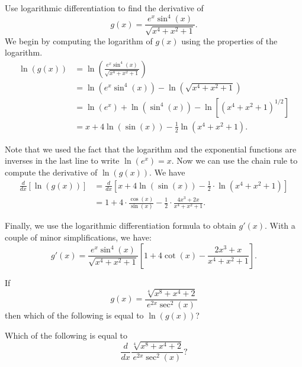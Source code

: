 \documentclass{ximera}
\begin{document}
\begin{example}
Use logarithmic differentiation to find the derivative of 
\[
g(x) = \frac{e^x \sin^4(x)}{\sqrt{x^4 + x^2 + 1}}.
\]
We begin by computing the logarithm of $g(x)$ using the properties of the logarithm.
\begin{align*}
\ln(g(x)) &= \ln\left(\frac{e^x \sin^4(x)}{\sqrt{x^4 + x^2 + 1}}\right)\\
&= \ln\left(e^x \sin^4(x)\right) - \ln\left(\sqrt{x^4 + x^2 + 1}\right)\\
&= \ln(e^x) + \ln(\sin^4(x)) - \ln[(x^4 + x^2 + 1)^{1/2}]\\
&= x + 4\ln(\sin(x)) - \frac12 \ln(x^4 + x^2 + 1).
\end{align*}

Note that we used the fact that the logarithm and the exponential functions are 
inverses in the last line
to write $\ln(e^x) = x$.
Now we can use the chain rule to compute the derivative of $\ln(g(x))$.
We have
\begin{align*}
\frac{d}{dx}\left[ \ln(g(x))\right] &= \frac{d}{dx}\left[ x + 4\ln(\sin(x)) - \frac12 \cdot \ln(x^4 + x^2 + 1)\right]\\
&= 1+ 4 \cdot \frac{\cos(x)}{\sin(x)} - \frac12 \cdot \frac{4x^3 + 2x}{x^4 + x^2 + 1}.
\end{align*}


Finally, we use the logarithmic differentiation formula to obtain $g'(x)$.
With a couple of minor simplifications, we have:
\[
g'(x) = \frac{e^x \sin^4(x)}{\sqrt{x^4 + x^2 + 1}} \left[1+ 4 \cot(x) - 
 \frac{2x^3 + x}{x^4 + x^2 + 1}\right].
\]

\end{example}

\begin{problem}
  If 
	\[
	g(x) = \frac{\sqrt[4]{x^8 + x^4 + 2}}{e^{2x} \sec^2(x)}
	\]
	then which of the following is equal to $\ln(g(x))$?
  \begin{multipleChoice}
  \end{multipleChoice}
\end{problem}



\begin{problem} %
  Which of the following is equal to 
  \[
  \frac{d}{dx} \frac{\sqrt[4]{x^8 + x^4 + 2}}{e^{2x} \sec^2(x)}?
  \]

  \begin{multipleChoice}
  \end{multipleChoice}
   
		
\end{problem}
\end{document}
